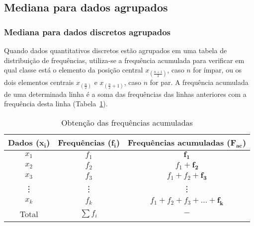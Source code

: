 \documentclass[11pt,fleqn]{book} %
\begin{document}
\subsection{Mediana para dados agrupados}
\vspace{0,3cm}
\subsubsection{Mediana para dados discretos agrupados}
\vspace{0,3cm}

Quando dados quantitativos discretos estão agrupados em uma tabela de distribuição de frequências, utiliza-se a frequência acumulada para verificar em qual classe está o elemento da posição central $x_{(\frac{n+1}{2})}$, caso $n$ for ímpar, ou os dois elementos centrais $x_{(\frac{n}{2})}$ e $x_{(\frac{n}{2}+1)}$, caso $n$ for par. A frequência acumulada de uma determinada linha é a soma das frequências das linhas anteriores com a frequência desta linha (Tabela~\ref{tab:tabfreqac}).

	\begin{table}[h]
	\caption{Obtenção das frequências acumuladas}
	\label{tab:tabfreqac} 
	\vspace{-0.1cm}
	\centering
	\begin{tabular}{c c c}
	\toprule
	\textbf{Dados} ($\bm{x_i}$) & \textbf{Frequências} ($\bm{f_i}$) & \textbf{Frequências acumuladas} ($\bm{F_{ac}}$) \\
	\midrule
	$x_1$  &  $f_1$  &  $\bm{f_1}$  \\
	$x_2$  &  $f_2$  &  $f_1+\bm{f_2}$  \\
	$x_3$  &  $f_3$  &  $f_1+f_2+\bm{f_3}$  \\
	\vdots  & \vdots &  \vdots \\
	$x_k$  &  $f_k$  &  $f_1+f_2+f_3+\hdots+\bm{f_k}$  \\
	\hline
	Total  &  $\sum{f_i}$ & $-$ \\
	\bottomrule
	\end{tabular} \\
	\end{table}

\vspace{2cm}
\end{document}
